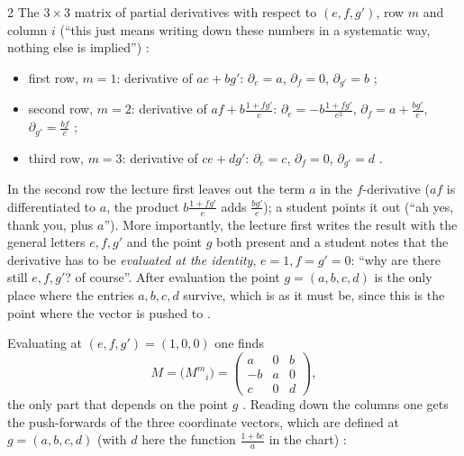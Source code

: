 \begin{paracol}{2}
The $3\times3$ matrix of partial derivatives with respect to $(e,f,g')$, row $m$ and column $i$ (``this just means writing down these numbers in a systematic way, nothing else is implied'')       :
\begin{itemize}
  \item first row, $m=1$: derivative of $ae+bg'$: $\partial_e=a$, $\partial_f=0$, $\partial_{g'}=b$ ;
  \item second row, $m=2$: derivative of $af+b\frac{1+fg'}{e}$: $\partial_e=-b\frac{1+fg'}{e^2}$, $\partial_f=a+\frac{bg'}{e}$, $\partial_{g'}=\frac{bf}{e}$    ;
  \item third row, $m=3$: derivative of $ce+dg'$: $\partial_e=c$, $\partial_f=0$, $\partial_{g'}=d$ .
\end{itemize}
\begin{coursenote}
In the second row the lecture first leaves out the term $a$ in the $f$-derivative ($af$ is differentiated to $a$, the product $b\frac{1+fg'}{e}$ adds $\frac{bg'}{e}$); a student points it out (``ah yes, thank you, plus $a$''). More importantly, the lecture first writes the result with the general letters $e,f,g'$ and the point $g$ both present and a student notes that the derivative has to be \emph{evaluated at the identity}, $e=1,f=g'=0$: ``why are there still $e,f,g'$? of course''. After evaluation the point $g=(a,b,c,d)$ is the only place where the entries $a,b,c,d$ survive, which is as it must be, since this is the point where the vector is pushed to        .
\end{coursenote}
Evaluating at $(e,f,g')=(1,0,0)$ one finds
\[
  M=\bigl(M^m{}_i\bigr)=\begin{pmatrix}a&0&b\\-b&a&0\\c&0&d\end{pmatrix},
\]
the only part that depends on the point $g$   . Reading down the columns one gets the push-forwards of the three coordinate vectors, which are defined at $g=(a,b,c,d)$ (with $d$ here the function $\frac{1+bc}{a}$ in the chart)    :

\end{paracol}
